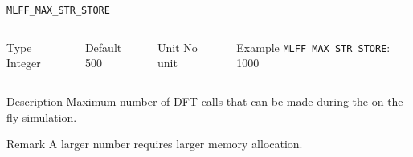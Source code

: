 \begin{frame}[allowframebreaks]{\texttt{{MLFF\_MAX\_STR\_STORE}}} \label{MLFF_MAX_STR_STORE}
\vspace*{-12pt}
\begin{columns}
\begin{block}{Type}
Integer
\end{block}

\begin{block}{Default}
500
\end{block}

\begin{block}{Unit}
No unit
\end{block}

\begin{block}{Example}
\texttt{MLFF\_MAX\_STR\_STORE}: 1000
\end{block}
\end{columns}

\begin{block}{Description}
 Maximum number of DFT calls that can be made during the on-the-fly simulation. 
\end{block}

\begin{block}{Remark}
A larger number requires larger memory allocation.
\end{block}
\end{frame}

